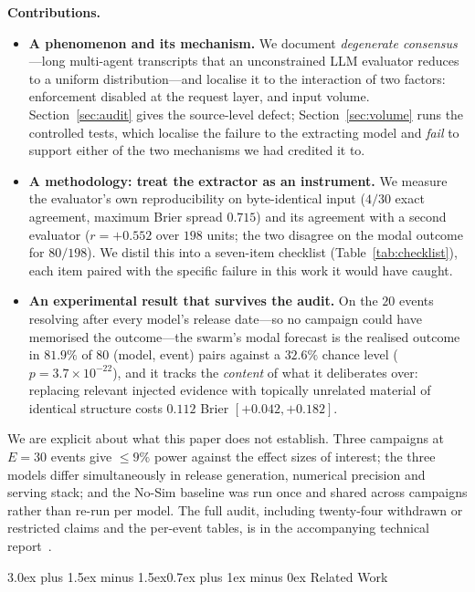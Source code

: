 \documentclass[10pt,conference]{IEEEtran}
\makeatletter
\renewcommand\section{\@startsection{section}{1}{\z@}%
  {3.0ex plus 1.5ex minus 1.5ex}{0.7ex plus 1ex minus 0ex}%
  {\normalfont\normalsize\centering\bfseries}}
\makeatother
\begin{document}
\textbf{Contributions.}
\begin{itemize}
  \item \textbf{A phenomenon and its mechanism.} We document \emph{degenerate consensus}---long multi-agent transcripts that an unconstrained LLM evaluator reduces to a uniform distribution---and localise it to the interaction of two factors: enforcement disabled at the request layer, and input volume. Section~\ref{sec:audit} gives the source-level defect; Section~\ref{sec:volume} runs the controlled tests, which localise the failure to the extracting model and \emph{fail} to support either of the two mechanisms we had credited it to.
  \item \textbf{A methodology: treat the extractor as an instrument.} We measure the evaluator's own reproducibility on byte-identical input ($4/30$ exact agreement, maximum Brier spread $0.715$) and its agreement with a second evaluator ($r = +0.552$ over $198$ units; the two disagree on the modal outcome for $80/198$). We distil this into a seven-item checklist (Table~\ref{tab:checklist}), each item paired with the specific failure in this work it would have caught.
  \item \textbf{An experimental result that survives the audit.} On the $20$ events resolving after every model's release date---so no campaign could have memorised the outcome---the swarm's modal forecast is the realised outcome in $81.9\%$ of $80$ (model, event) pairs against a $32.6\%$ chance level ($p = 3.7\times10^{-22}$), and it tracks the \emph{content} of what it deliberates over: replacing relevant injected evidence with topically unrelated material of identical structure costs $0.112$ Brier $[+0.042, +0.182]$.
\end{itemize}

We are explicit about what this paper does not establish. Three campaigns at $E=30$ events give $\leq 9\%$ power against the effect sizes of interest; the three models differ simultaneously in release generation, numerical precision and serving stack; and the No-Sim baseline was run once and shared across campaigns rather than re-run per model. The full audit, including twenty-four withdrawn or restricted claims and the per-event tables, is in the accompanying technical report~\cite{techreport}.

\section{Related Work}
\label{sec:related}
\end{document}

